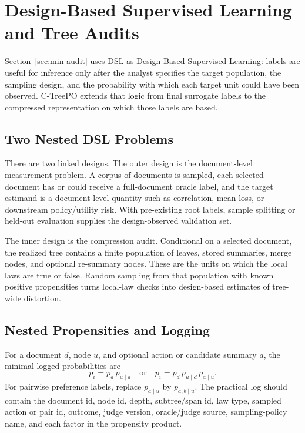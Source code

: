 \section{Design-Based Supervised Learning and Tree Audits}\label{app:v4-dsl-audit}

Section~\ref{sec:min-audit} uses DSL as Design-Based Supervised Learning:
labels are useful for inference only after the analyst specifies the target
population, the sampling design, and the probability with which each target
unit could have been observed. C-TreePO extends that logic from final
surrogate labels to the compressed representation on which those labels are
based.

\subsection{Two Nested DSL Problems}

There are two linked designs. The outer design is the document-level
measurement problem. A corpus of documents is sampled, each selected document
has or could receive a full-document oracle label, and the target estimand is
a document-level quantity such as correlation, mean loss, or downstream
policy/utility risk. With pre-existing root labels, sample splitting or
held-out evaluation supplies the design-observed validation set.

The inner design is the compression audit. Conditional on a selected document,
the realized tree contains a finite population of leaves, stored summaries,
merge nodes, and optional re-summary nodes. These are the units on which the
local laws are true or false. Random sampling from that population with known
positive propensities turns local-law checks into design-based estimates of
tree-wide distortion.

\subsection{Nested Propensities and Logging}

For a document $d$, node $u$, and optional action or candidate summary $a$,
the minimal logged probabilities are
\[
  p_i = p_d\,p_{u\mid d}
  \quad\text{or}\quad
  p_i = p_d\,p_{u\mid d}\,p_{a\mid u}.
\]
For pairwise preference labels, replace $p_{a\mid u}$ by
$p_{a,b\mid u}$. The practical log should contain the document id, node id,
depth, subtree/span id, law type, sampled action or pair id, outcome, judge
version, oracle/judge source, sampling-policy name, and each factor in the
propensity product.


